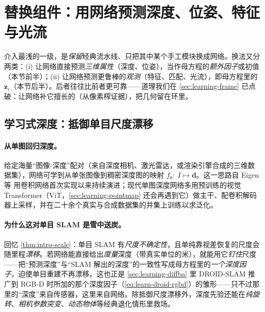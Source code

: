 \section{替换组件：用网络预测深度、位姿、特征与光流}
\label{sec:learning-predict}

介入最浅的一级，是\emph{保留}经典流水线、只把其中某个手工模块换成网络。换法又分两类：(i) 让网络直接预测\emph{三维属性}（深度、位姿），当作母方程的\emph{额外因子}或初值（本节前半）；(ii) 让网络预测更鲁棒的\emph{观测}（特征、匹配、光流），即母方程里的 $\mathbf{z}_i$（本节后半）。后者往往比前者更可靠——道理我们在 \cref{sec:learning-frame} 已点破：让网络补它擅长的（从像素榨证据），把几何留在环里。

\subsection{学习式深度：抵御单目尺度漂移}
\label{sec:learning-depth}

\paragraph{从单图回归深度。}
给定海量“图像-深度”配对（来自深度相机、激光雷达，或渲染引擎合成的三维数据集），网络可学到从单张图像到稠密深度图的映射 $f_\theta:\;I\mapsto\mathbf{d}$\cite{teed2026boosting}。这一思路自 Eigen 等\cite{eigen2014depth} 用卷积网络首次实现以来持续演进；现代单图深度网络多用预训练的视觉 Transformer（ViT，\cref{sec:learning-pointmap} 还会再遇到它）做主干、配卷积解码器上采样，并在二十余个真实与合成数据集的并集上训练以求泛化\cite{ranftl2021dpt}。

\paragraph{为什么这对单目 SLAM 是雪中送炭。}
回忆 \cref{thm:intro-scale}：单目 SLAM 有\emph{尺度不确定性}，且单纯靠视差恢复的尺度会随里程\emph{漂移}。若网络能直接给出\emph{度量}深度（带真实单位的米），就能用它\emph{钉住}尺度——把“预测深度”与“SLAM 解出的深度”的一致性写成母方程里的\emph{一个深度因子}，迫使单目重建不再漂移\cite{teed2026boosting}。这也正是 \cref{sec:learning-diffba} 里 DROID-SLAM 推广到 RGB-D 时所加的那个深度因子（\cref{eq:learn-droid-rgbd}）的雏形——只不过那里的“深度”来自传感器，这里来自网络。除抵御尺度漂移外，深度先验还能在\emph{纯旋转}、\emph{相机参数突变}、\emph{动态物体}等经典退化情形里救场。

